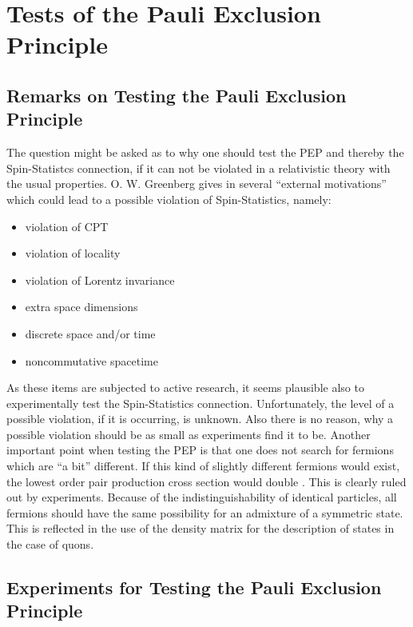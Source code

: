 \section{Tests of the Pauli Exclusion Principle}


\subsection{Remarks on Testing the Pauli Exclusion Principle}

The question might be asked as to why one should test the PEP and thereby the Spin-Statistcs connection, if it can not be violated in a relativistic theory with the usual properties. O. W. Greenberg gives in \cite{Greenberg2000} several ``external motivations'' which could lead to a possible violation of Spin-Statistics, namely:
\begin{itemize}
 \item violation of CPT
 \item violation of locality
 \item violation of Lorentz invariance
 \item extra space dimensions
 \item discrete space and/or time
 \item noncommutative spacetime
\end{itemize}
As these items are subjected to active research, it seems plausible also to experimentally test the Spin-Statistics connection. Unfortunately, the level of a possible violation, if it is occurring, is unknown. Also there is no reason, why a possible violation should be as small as experiments find it to be. Another important point when testing the PEP is that one does not search for fermions which are ``a bit'' different. If this kind of slightly different fermions would exist, the lowest order pair production cross section would double \cite{Greenberg2000}. This is clearly ruled out by experiments. Because of the indistinguishability of identical particles, all fermions should have the same possibility for an admixture of a symmetric state. This is reflected in the use of the density matrix for the description of states in the case of quons.

\subsection{Experiments for Testing the Pauli Exclusion Principle}
\label{sec:experiments}

